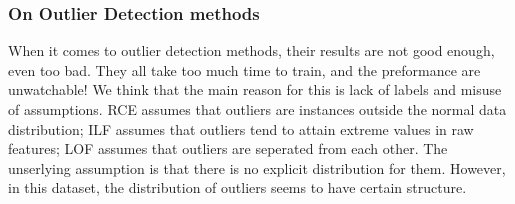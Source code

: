 \documentclass[english]{article}
\begin{document}
\subsubsection{On Outlier Detection methods}
\par When it comes to outlier detection methods, their results are not good enough, even too bad. They all take too much time to train, and the preformance are unwatchable! We think that the main reason for this is lack of labels and misuse of assumptions. RCE assumes that outliers are instances outside the normal data distribution; ILF assumes that outliers tend to attain extreme values in raw features; LOF assumes that outliers are seperated from each other.  The unserlying assumption is that there is no explicit distribution for them. However, in this dataset, the distribution of outliers seems to have certain structure. 
\end{document}
